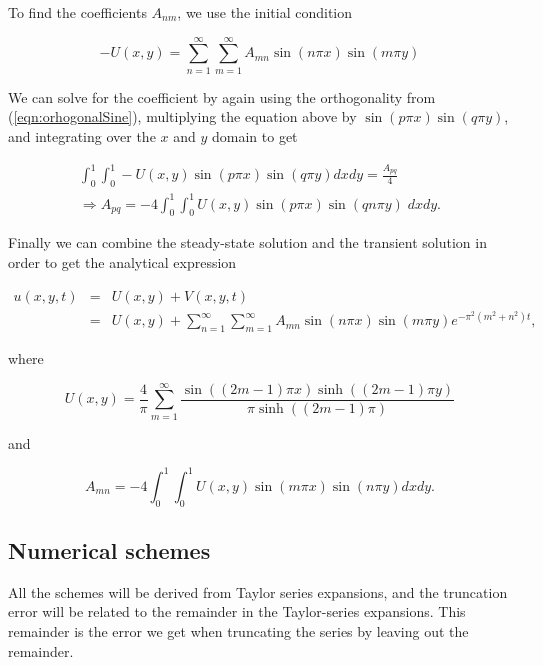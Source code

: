 \documentclass{article}
\begin{document}
To find the coefficients $A_{nm}$, we use the initial condition

\begin{equation}
-U(x,y) =  \sum_{n=1}^{\infty} \sum_{m=1}^{\infty} A_{mn}\sin(n\pi x)\sin(m\pi y)
\end{equation}

We can solve for the coefficient by again using the orthogonality from (\ref{eqn:orhogonalSine}), multiplying the equation above by $ \sin(p\pi x) \sin(q\pi y)$, and integrating over the $x$ and $y$ domain to get

\begin{subequations}
	\begin{eqnarray}
	\int_0^1 \int_0^1 -U(x,y) \sin(p\pi x)\sin(q\pi y) dxdy =  \frac{A_{pq}}{4}\\
	\Rightarrow A_{pq} = -4 \int_0^1 \int_0^1 U(x,y) \sin(p\pi x)\sin(qn\pi y)\; dxdy.
	\end{eqnarray}
\end{subequations}

Finally we can combine the steady-state solution and the transient solution in order to get the analytical expression

\begin{eqnarray}
u(x,y,t) &=& U(x,y) + V(x,y,t)\\ \nonumber
&=& U(x,y) + \sum_{n=1}^{\infty} \sum_{m=1}^{\infty} A_{mn}\sin(n\pi x)\sin(m\pi y)e^{-\pi^2(m^2+n^2)t},
\end{eqnarray}

where

\begin{equation}
U(x,y) = \frac{4}{\pi} \sum_{m=1}^{\infty} \frac{\sin((2m-1)\pi x)\sinh((2m-1)\pi y)}{\pi \sinh((2m-1)\pi)}
\end{equation}

and 

\begin{equation}
A_{mn} = -4 \int_0^1 \int_0^1 U(x,y) \sin(m\pi x)\sin(n\pi y) dxdy.
\end{equation}



\subsection{Numerical schemes}
All the schemes will be derived from Taylor series expansions, and the truncation error will be related to the remainder in the Taylor-series expansions. This remainder is the error we get when truncating the series by leaving out the remainder.\\
\end{document}
